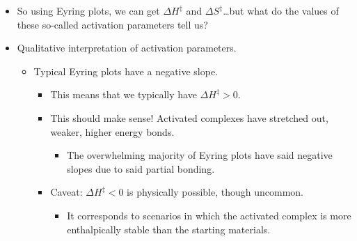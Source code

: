 \documentclass[../notes.tex]{subfiles}
\begin{document}
\begin{itemize}
\begin{align*}
        \ln(\frac{kh}{\kappa\kB T}) &= -\frac{\Delta H^\ddagger}{R}\left( \frac{1}{T} \right)+\frac{\Delta S^\ddagger}{R}
    \end{align*}
    \begin{itemize}
        \item These manipulations allow us to take the Eyring equation in slope-intercept form, so that we can linearize experimental data and extract from it experimental values for $\Delta H^\ddagger$ and $\Delta S^\ddagger$!
        \begin{itemize}
            \item This process is called forming an \textbf{Eyring plot}.
            \item If we can acquire data over a minimum temperature range of \SI{30}{\kelvin}, we can extrapolate reasonably accurate data.
        \end{itemize}
        \item Dick Zare at Stanford has some methods of observing activated complexes, but the main way of learning about them is indirectly through methods such as Eyring plots.
    \end{itemize}
    \item So using Eyring plots, we can get $\Delta H^\ddagger$ and $\Delta S^\ddagger$\dots but what do the values of these so-called activation parameters tell us?
    \item Qualitative interpretation of activation parameters.
    \begin{itemize}
        \item Typical Eyring plots have a negative slope.
        \begin{itemize}
            \item This means that we typically have $\Delta H^\ddagger>0$.
            \item This should make sense! Activated complexes have stretched out, weaker, higher energy bonds.
            \begin{itemize}
                \item The overwhelming majority of Eyring plots have said negative slopes due to said partial bonding.
            \end{itemize}
            \item Caveat: $\Delta H^\ddagger<0$ is physically possible, though uncommon.
            \begin{itemize}
                \item It corresponds to scenarios in which the activated complex is more enthalpically stable than the starting materials.

\end{itemize}
\end{itemize}
\end{itemize}
\end{itemize}
\end{document}
